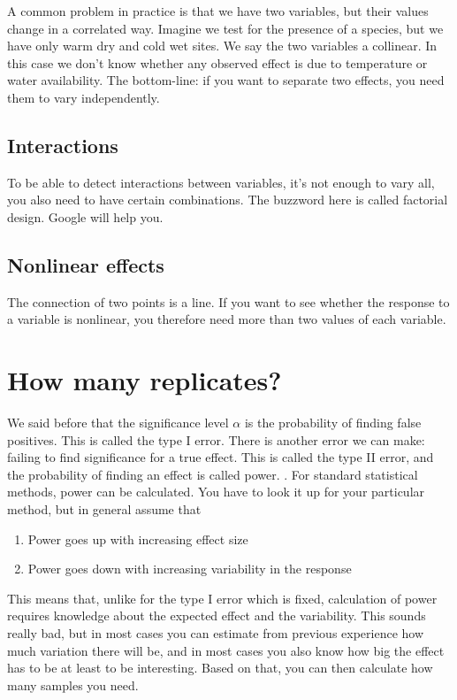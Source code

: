 \documentclass[a4paper,twoside]{tufte-book} %
\begin{document}
A common problem in practice is that we have two variables,  but their values change in a correlated way. Imagine we test for the presence of a species, but we have only warm dry and cold wet sites. We say the two variables a collinear. In this case we don't know whether any observed effect is due to temperature or water availability. The bottom-line: if you want to separate two effects, you need them to vary independently. 

\subsection{Interactions}

To be able to detect interactions between variables, it's not enough to vary all, you also need to have certain combinations. The buzzword here is called factorial design. Google will help you.

\subsection{Nonlinear effects}

The connection of two points is a line. If you want to see whether the response to a variable is nonlinear, you therefore need more than two values of each variable.  


\section{How many replicates?}

We said before that the significance level $\alpha$ is the probability of finding false positives. This is called the type I error. There is another error we can make: failing to find significance for a true effect. This is called the type II error, and the probability of finding an effect is called power. . For standard statistical methods, power can be calculated. You have to look it up for your particular method, but in general assume that 

\begin{enumerate}
\item Power goes up with increasing effect size
\item Power goes down with increasing variability in the response
\end{enumerate}

This means that, unlike for the type I error which is fixed, calculation of power requires knowledge about the expected effect and the variability. This sounds really bad, but in most cases you can estimate from previous experience how much variation there will be, and in most cases you also know how big the effect has to be at least to be interesting. Based on that, you can then calculate how many samples you need. \\
\end{document}
